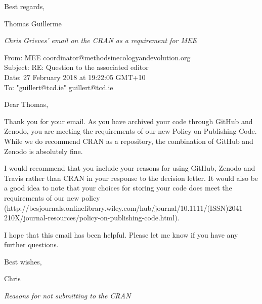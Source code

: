 \documentclass[12pt,letterpaper]{article}
\renewcommand{\subsection}[1]{%
\bigskip
\begin{center}
\begin{large}
\normalfont\itshape #1
\end{large}
\end{center}}
\begin{document}
\bigskip

Best regards,

\bigskip

Thomas Guillerme

\bigskip

\newpage

\subsection{Chris Grieves' email on the CRAN as a requirement for MEE}

\noindent From: MEE coordinator@methodsinecologyandevolution.org\\
\noindent Subject: RE: Question to the associated editor\\
\noindent Date: 27 February 2018 at 19:22:05 GMT+10\\
\noindent To: "guillert@tcd.ie" guillert@tcd.ie\\

\bigskip

\noindent Dear Thomas,

\bigskip

\noindent Thank you for your email. As you have archived your code through GitHub and Zenodo, you are meeting the requirements of our new Policy on Publishing Code. While we do recommend CRAN as a repository, the combination of GitHub and Zenodo is absolutely fine.
 
I would recommend that you include your reasons for using GitHub, Zenodo and Travis rather than CRAN in your response to the decision letter. It would also be a good idea to note that your choices for storing your code does meet the requirements of our new policy (http://besjournals.onlinelibrary.wiley.com/hub/journal/10.1111/(ISSN)2041-210X/journal-resources/policy-on-publishing-code.html).
 
I hope that this email has been helpful. Please let me know if you have any further questions.

\bigskip 

\noindent Best wishes,

\bigskip

\noindent Chris



\subsection{Reasons for not submitting to the CRAN}
\end{document}

